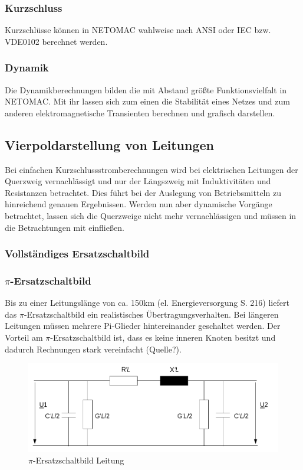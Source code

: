 \documentclass{scrartcl}
\begin{document}
\begin{onehalfspace}
\subsubsection{Kurzschluss}
Kurzschlüsse können in NETOMAC wahlweise nach ANSI oder IEC bzw. VDE0102 berechnet werden.


\subsubsection{Dynamik}
Die Dynamikberechnungen bilden die mit Abstand größte Funktionsvielfalt in NETOMAC. Mit ihr lassen sich zum einen die Stabilität eines Netzes und zum anderen elektromagnetische Transienten berechnen und grafisch darstellen.

\subsection{Vierpoldarstellung von Leitungen}
Bei einfachen Kurzschlussstromberechnungen wird bei elektrischen Leitungen der Querzweig vernachlässigt und nur der Längszweig mit Induktivitäten und Resistanzen betrachtet. Dies führt bei der Auslegung von Betriebsmitteln zu hinreichend genauen Ergebnissen. Werden nun aber dynamische Vorgänge betrachtet, lassen sich die Querzweige nicht mehr vernachlässigen und müssen in die Betrachtungen mit einfließen.

\subsubsection{Vollständiges Ersatzschaltbild}


\subsubsection{$\pi$-Ersatzschaltbild}
Bis zu einer Leitungslänge von ca. 150km (el. Energieversorgung S. 216) liefert das $\pi$-Ersatzschaltbild ein realistisches Übertragungsverhalten. Bei längeren Leitungen müssen mehrere Pi-Glieder hintereinander geschaltet werden. Der Vorteil am $\pi$-Ersatzschaltbild ist, dass es keine inneren Knoten besitzt und dadurch Rechnungen stark vereinfacht (Quelle?).

	\begin{figure}[H]
	\centering
	\includegraphics[scale=0.5]{img/pi-esb.png}
	\caption{$\pi$-Ersatzschaltbild Leitung}
	\label{pi-esb}
	\end{figure}


\end{onehalfspace}
\end{document}
